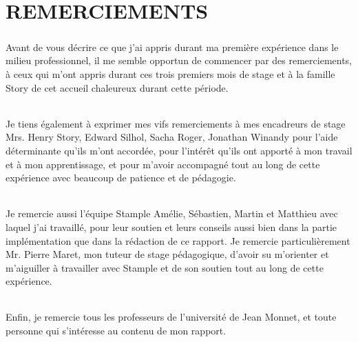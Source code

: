 \chapter{REMERCIEMENTS}
\paragraph{}
Avant de vous décrire ce que j'ai appris durant ma première expérience dans le milieu 
professionnel, il me semble opportun de commencer par des remerciements, à ceux qui m'ont 
appris durant ces trois premiers mois de stage et à la famille Story de cet accueil chaleureux 
durant cette période.
\subparagraph{}
Je tiens également à exprimer mes vifs remerciements à mes encadreurs de stage Mrs. Henry 
Story, Edward Silhol, Sacha Roger, Jonathan Winandy pour l'aide déterminante qu'ils m’ont accordée, pour l'intérêt qu'ils ont apporté à mon travail et 
à mon apprentissage, et pour m’avoir accompagné tout au long de cette expérience avec 
beaucoup de patience et de pédagogie.
\subparagraph{}
Je remercie aussi l'équipe Stample Amélie, Sébastien, Martin et Matthieu avec 
laquel j'ai travaillé, pour leur soutien et leurs conseils aussi bien dans la partie 
implémentation que dans la rédaction de ce rapport.
Je remercie particulièrement Mr. Pierre Maret, mon tuteur de stage pédagogique, d'avoir su 
m'orienter et m'aiguiller à travailler avec Stample et de son soutien tout au long de cette 
expérience.
\subparagraph{}
Enfin, je remercie tous les professeurs de l'université de Jean Monnet, et toute personne qui 
s'intéresse au contenu de mon rapport.